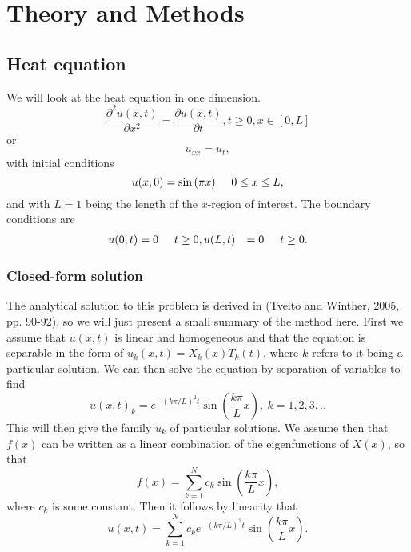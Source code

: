 \section{Theory and Methods}

\subsection{Heat equation}
We will look at the heat equation in one dimension.
\begin{equation}
    \frac{\partial^2 u(x,t)}{\partial x^2} =\frac{\partial u(x,t)}{\partial t},
    t\geq 0, x\in [0,L]
\end{equation}
or
\begin{equation}\label{eq:heat_eq}
    u_{xx} = u_t,
\end{equation}
with initial conditions
\begin{equation}\label{eq:boundary_x}
    u(x,0)= \sin{(\pi x)} \hspace{0.5cm} 0 \leq x \leq L,
\end{equation}
and with $L=1$ being the length of the $x$-region of interest. The 
boundary conditions are
\begin{align}\label{eq:boundary_t}
    u(0,t) &= 0 \hspace{0.5cm} t \ge 0,
    u(L,t) &= 0 \hspace{0.5cm} t \ge 0.
\end{align}

\subsubsection{Closed-form solution}
The analytical solution to this problem is derived in (Tveito and
Winther, 2005, pp. 90-92)\cite{1}, so we will just present a small
summary of the method here. First we assume that $u(x,t)$ is linear and homogeneous and 
that the equation is separable in the form of $u_k(x,t)=X_k(x)T_k(t)$, where
$k$ refers to it being a particular solution. We can then solve the equation 
by separation of variables to find
\begin{equation*}
    u(x,t)_k=e^{-(k\pi/L)^2t}\sin{\left(\frac{k\pi}{L}x\right)},\ k=1,2,3,..
\end{equation*}
This will then give the family ${u_k}$ of particular solutions. We assume then
that $f(x)$ can be written as a linear combination of the eigenfunctions of
$X(x)$, so that
\begin{equation*}
    f(x)=\sum_{k=1}^{N} c_k \sin{\left(\frac{k\pi}{L}x\right)},
\end{equation*}
where $c_k$ is some constant. Then it follows by linearity that
\begin{equation*}
u(x,t)=\sum_{k=1}^N c_ke^{-(k\pi/L)^2t}\sin{\left(\frac{k\pi}{L}x\right)}.
\end{equation*}

